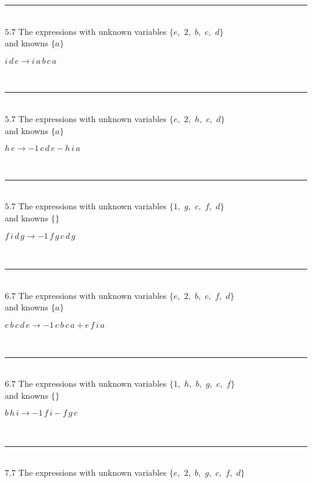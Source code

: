 \documentclass[rep10,leqno]{report}
\begin{document}
\rule[3pt]{6in}{.7pt}\\
$5.7$  The expressions with unknown variables $\{e,
$ $
2,
$ $
b,
$ $
c,
$ $
d\}$\\
and knowns $\{a\}$\smallskip\\
\begin{minipage}{6in}
$
i\,
 d\,
 e\rightarrow i\,
 a\,
 b\,
 c\,
 a
$
\end{minipage}\\
\rule[3pt]{6in}{.7pt}\\
$5.7$  The expressions with unknown variables $\{e,
$ $
2,
$ $
h,
$ $
c,
$ $
d\}$\\
and knowns $\{a\}$\smallskip\\
\begin{minipage}{6in}
$
h\,
 e\rightarrow -1\,
 c\,
 d\,
 e - h\,
 i\,
 a
$
\end{minipage}\\
\rule[3pt]{6in}{.7pt}\\
$5.7$  The expressions with unknown variables $\{1,
$ $
g,
$ $
c,
$ $
f,
$ $
d\}$\\
and knowns $\{\}$\smallskip\\
\begin{minipage}{6in}
$
f\,
 i\,
 d\,
 g\rightarrow -1\,
 f\,
 g\,
 c\,
 d\,
 g
$
\end{minipage}\\
\rule[3pt]{6in}{.7pt}\\
$6.7$  The expressions with unknown variables $\{e,
$ $
2,
$ $
b,
$ $
c,
$ $
f,
$ $
d\}$\\
and knowns $\{a\}$\smallskip\\
\begin{minipage}{6in}
$
e\,
 b\,
 c\,
 d\,
 e\rightarrow -1\,
 e\,
 b\,
 c\,
 a + e\,
 f\,
 i\,
 a
$
\end{minipage}\\
\rule[3pt]{6in}{.7pt}\\
$6.7$  The expressions with unknown variables $\{1,
$ $
h,
$ $
b,
$ $
g,
$ $
c,
$ $
f\}$\\
and knowns $\{\}$\smallskip\\
\begin{minipage}{6in}
$
b\,
 h\,
 i\rightarrow -1\,
 f\,
 i - f\,
 g\,
 c
$
\end{minipage}\\
\rule[3pt]{6in}{.7pt}\\
$7.7$  The expressions with unknown variables $\{e,
$ $
2,
$ $
b,
$ $
g,
$ $
c,
$ $
f,
$ $
d\}$\\
\end{document}

